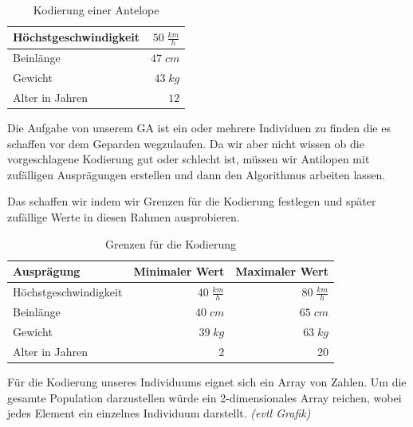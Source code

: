             \begin{multicols}{2}
                \hfill \\[-10mm]
                \begin{table}[H]
                    \begin{center}
                    \begin{tabular}{ |l|r| } 
                        \hline
                        Höchstgeschwindigkeit    & $ 50\; \frac{km}{h}$   \\ \hline
                        Beinlänge                & $ 47\; cm          $   \\ \hline
                        Gewicht                  & $ 43\; kg          $   \\ \hline
                        Alter in Jahren          & $ 12               $   \\ \hline
                    \end{tabular}
                    \end{center}
                    \caption{Kodierung einer Antelope \label{fig:somelabel}}
                \end{table}

                \noindent
                Die Aufgabe von unserem GA ist ein oder mehrere Individuen zu finden die es schaffen vor dem Geparden wegzulaufen. Da wir aber nicht wissen ob die vorgeschlagene Kodierung gut oder schlecht ist, müssen wir Antilopen mit zufälligen Ausprägungen erstellen und dann den Algorithmus arbeiten lassen.
            \end{multicols}
            \noindent
            Das schaffen wir indem wir Grenzen für die Kodierung festlegen und später zufällige Werte in diesen Rahmen ausprobieren.

            \begin{table}[H]
                \begin{center}
                \begin{tabular}{ |l|r|r| } 
                    \hline
                    Ausprägung               & Minimaler Wert        & Maximaler Wert       \\ \hline
                    Höchstgeschwindigkeit    & $ 40\; \frac{km}{h}$  & $ 80\; \frac{km}{h}$ \\ \hline
                    Beinlänge                & $ 40\; cm          $  & $ 65\; cm          $ \\ \hline
                    Gewicht                  & $ 39\; kg          $  & $ 63\; kg          $ \\ \hline
                    Alter in Jahren          & $  2               $  & $ 20               $ \\ \hline
                \end{tabular}
                \end{center}
                \caption{Grenzen für die Kodierung \label{fig:somelabel}}
            \end{table}
            \noindent
            Für die Kodierung unseres Individuums eignet sich ein Array von Zahlen. Um die gesamte Population darzustellen würde ein 2-dimensionales Array reichen, wobei jedes Element ein einzelnes Individuum darstellt. \textit{(evtl Grafik)}

